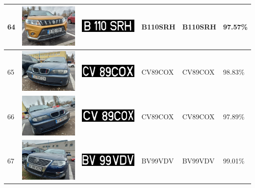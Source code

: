 \documentclass[a4paper,12pt]{report}
\begin{document}
\begin{longtable}{| m{0.6cm} | m{3cm} | m{3cm} | m{1.8cm} | m{1.8cm} | m{1.8cm} |}
    64  & \includegraphics[width=3cm,keepaspectratio]{dataset/36_s1.jpg}  & \includegraphics[width=3cm,keepaspectratio]{segmentari/64.jpg}  & B110SRH             & B110SRH              & 97.57\%    \\ \hline
    65  & \includegraphics[width=3cm,keepaspectratio]{dataset/37_d1.jpg}  & \includegraphics[width=3cm,keepaspectratio]{segmentari/65.jpg}  & CV89COX             & CV89COX              & 98.83\%    \\ \hline
    66  & \includegraphics[width=3cm,keepaspectratio]{dataset/37_s1.jpg}  & \includegraphics[width=3cm,keepaspectratio]{segmentari/66.jpg}  & CV89COX             & CV89COX              & 97.89\%    \\ \hline
    67  & \includegraphics[width=3cm,keepaspectratio]{dataset/38_d1.jpg}  & \includegraphics[width=3cm,keepaspectratio]{segmentari/67.jpg}  & BV99VDV             & BV99VDV              & 99.01\%    \\ \hline

\end{longtable}
\end{document}
